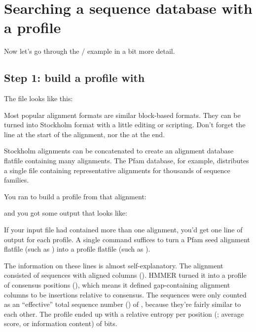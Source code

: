 \section{Searching a sequence database with a profile}

Now let's go through the / example in a
bit more detail.

\subsection{Step 1: build a profile with }

The file  looks like this:


Most popular alignment formats are similar block-based formats. They
can be turned into Stockholm format with a little editing or
scripting. Don't forget the  line at the start
of the alignment, nor the \mono{//} at the end. 

Stockholm alignments can be concatenated to create an alignment
database flatfile containing many alignments. The Pfam database, for
example, distributes a single file containing representative
alignments for thousands of sequence families.

You ran  to build a profile from that
alignment:

   \vspace{1ex}
   \vspace{1ex}

and you got some output that looks like:


If your input file had contained more than one alignment, you'd get
one line of output for each profile. A single  command
suffices to turn a Pfam seed alignment flatfile (such as
) into a profile flatfile (such as
).

The information on these lines is almost self-explanatory. The
 alignment consisted of \BGLnseq{} sequences with
\BGLalen{} aligned columns (). HMMER turned it into a profile
of \BGLmlen{} consensus positions (), which means it
defined \BGLgaps{} gap-containing alignment columns to be insertions
relative to consensus. The \BGLnseq{} sequences were only counted as
an ``effective'' total sequence number () of
\BGLeffn{}, because they're fairly similar to each
other.
The profile ended up with a relative entropy per position
(; average score, or information content) of \BGLre{}
bits.

